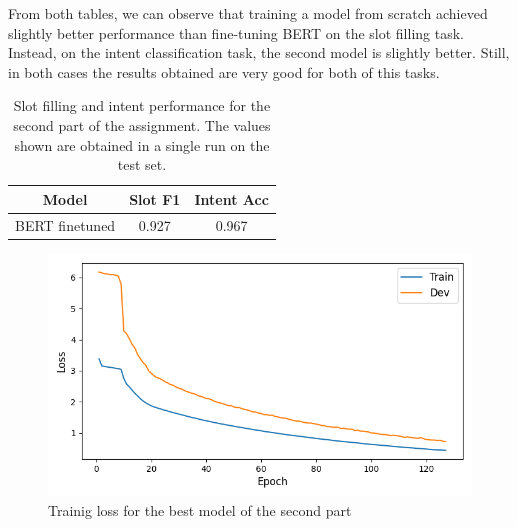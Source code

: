 \documentclass[a4paper]{article}
\begin{document}
From both tables, we can observe that training a model from scratch achieved slightly better performance than fine-tuning BERT on the slot filling task. Instead, on the intent classification task, the second model is slightly better. 
Still, in both cases the results obtained are very good for both of this tasks.

\begin{table}[h]
  \centering
  \begin{tabular}{|c|c|c|}
    \hline
    \textbf{Model} & \textbf{Slot F1} & \textbf{Intent Acc} \\
    \hline
    BERT finetuned& 0.927 & 0.967 \\
    \hline
  \end{tabular}
  \caption{Slot filling and intent performance for the second part of the assignment. The values shown are obtained in a single run on the test set.}
  \label{tab:results2}
\end{table}

\begin{figure}[h]
  \includegraphics[width=\linewidth]{./images/plot_2_loss.png}
  \caption{Trainig loss for the best model of the second part}
  \label{fig:fig2}
\end{figure}





\end{document}
